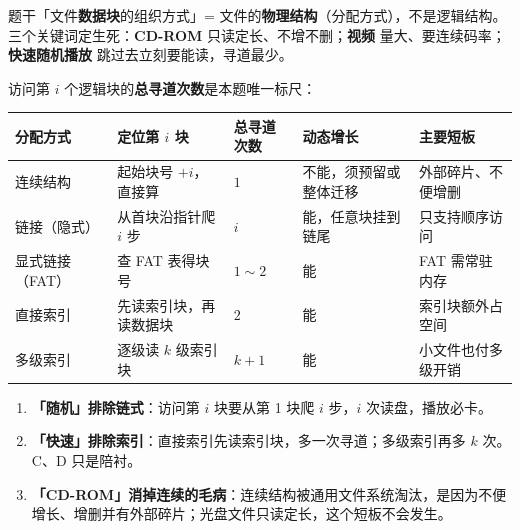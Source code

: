 \documentclass[11pt,a4paper]{ctexart}
\begin{document}

题干「文件\textbf{数据块}的组织方式」= 文件的\textbf{物理结构}（分配方式），不是逻辑结构。三个关键词定生死：\textbf{CD-ROM} 只读定长、不增不删；\textbf{视频} 量大、要连续码率；\textbf{快速随机播放} 跳过去立刻要能读，寻道最少。



访问第 $i$ 个逻辑块的\textbf{总寻道次数}是本题唯一标尺：

\begin{center}\small
\begin{tabularx}{\linewidth}{@{}>{\raggedright\arraybackslash}X>{\raggedright\arraybackslash}X>{\raggedright\arraybackslash}X>{\raggedright\arraybackslash}X>{\raggedright\arraybackslash}X@{}}
\toprule
分配方式 & 定位第 $i$ 块 & 总寻道次数 & 动态增长 & 主要短板 \\
\midrule
连续结构 & 起始块号 $+i$，直接算 & $1$ & 不能，须预留或整体迁移 & 外部碎片、不便增删 \\
链接（隐式） & 从首块沿指针爬 $i$ 步 & $i$ & 能，任意块挂到链尾 & 只支持顺序访问 \\
显式链接（FAT） & 查 FAT 表得块号 & $1\sim2$ & 能 & FAT 需常驻内存 \\
直接索引 & 先读索引块，再读数据块 & $2$ & 能 & 索引块额外占空间 \\
多级索引 & 逐级读 $k$ 级索引块 & $k+1$ & 能 & 小文件也付多级开销 \\
\bottomrule
\end{tabularx}
\end{center}



\begin{enumerate}

\item \textbf{「随机」排除链式}：访问第 $i$ 块要从第 1 块爬 $i$ 步，$i$ 次读盘，播放必卡。

\item \textbf{「快速」排除索引}：直接索引先读索引块，多一次寻道；多级索引再多 $k$ 次。C、D 只是陪衬。

\item \textbf{「CD-ROM」消掉连续的毛病}：连续结构被通用文件系统淘汰，是因为不便增长、增删并有外部碎片；光盘文件只读定长，这个短板不会发生。

\end{enumerate}
\end{document}
